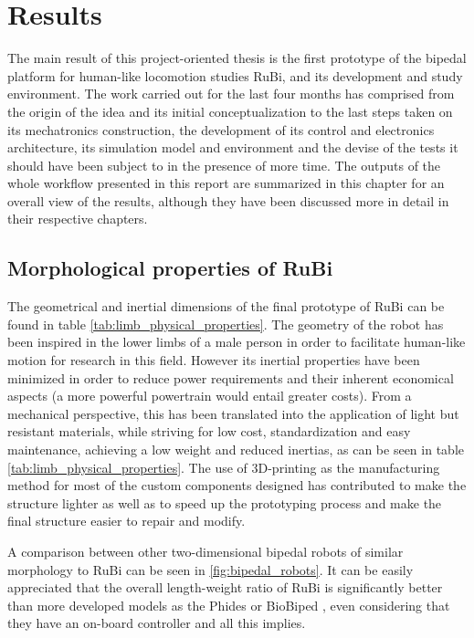 \chapter{Results} %
\label{cha:results}
The main result of this project-oriented thesis is the first prototype of the bipedal platform for human-like locomotion studies RuBi, and its development and study environment.
The work carried out for the last four months has comprised from the origin of the idea and its initial conceptualization to the last steps taken on its mechatronics construction, the development of its control and electronics architecture, its simulation model and environment and the devise of the tests it should have been subject to in the presence of more time.
The outputs of the whole workflow presented in this report are summarized in this chapter for an overall view of the results, although they have been discussed more in detail in their respective chapters.


\section{Morphological properties of RuBi} %
\label{sec:rubi_mechanical_properties}
The geometrical and inertial dimensions of the final prototype of RuBi can be found in table \ref{tab:limb_physical_properties}.
The geometry of the robot has been inspired in the lower limbs of a male person in order to facilitate human-like motion for research in this field.
However its inertial properties have been minimized in order to reduce power requirements and their inherent economical aspects (a more powerful powertrain would entail greater costs).
From a mechanical perspective, this has been translated into the application of light but resistant materials, while striving for low cost, standardization and easy maintenance, achieving a low weight and reduced inertias, as can be seen in table \ref{tab:limb_physical_properties}.
The use of 3D-printing as the manufacturing method for most of the custom components designed has contributed to make the structure lighter as well as to speed up the prototyping process and make the final structure easier to repair and modify.

A comparison between other two-dimensional bipedal robots of similar morphology to RuBi can be seen in \ref{fig:bipedal_robots}.
It can be easily appreciated that the overall length-weight ratio of RuBi is significantly better than more developed models as the Phides \cite{phides} or BioBiped \cite{biobiped}, even considering that they have an on-board controller and all this implies.

